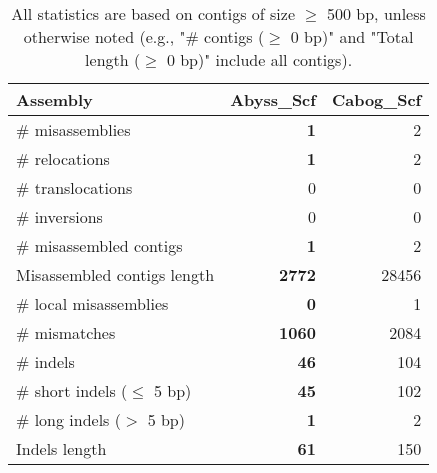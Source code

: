 \documentclass[12pt,a4paper]{article}
\begin{document}
\begin{table}[ht]
\begin{center}
\caption{All statistics are based on contigs of size $\geq$ 500 bp, unless otherwise noted (e.g., "\# contigs ($\geq$ 0 bp)" and "Total length ($\geq$ 0 bp)" include all contigs).}
\begin{tabular}{|l*{2}{|r}|}
\hline
Assembly & Abyss\_Scf & Cabog\_Scf \\ \hline
\# misassemblies & {\bf 1} & 2 \\ \hline
\hspace{5mm}\# relocations & {\bf 1} & 2 \\ \hline
\hspace{5mm}\# translocations & 0 & 0 \\ \hline
\hspace{5mm}\# inversions & 0 & 0 \\ \hline
\# misassembled contigs & {\bf 1} & 2 \\ \hline
Misassembled contigs length & {\bf 2772} & 28456 \\ \hline
\# local misassemblies & {\bf 0} & 1 \\ \hline
\# mismatches & {\bf 1060} & 2084 \\ \hline
\# indels & {\bf 46} & 104 \\ \hline
\hspace{5mm}\# short indels ($\leq$ 5 bp) & {\bf 45} & 102 \\ \hline
\hspace{5mm}\# long indels ($>$ 5 bp) & {\bf 1} & 2 \\ \hline
Indels length & {\bf 61} & 150 \\ \hline
\end{tabular}
\end{center}
\end{table}
\end{document}
